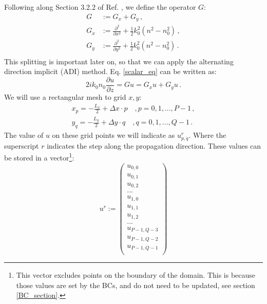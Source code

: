 \documentclass[]{article}
\begin{document}
	Following along Section 3.2.2 of Ref. \cite{Lifante_2015}, we define the operator $G$:
	\begin{subequations}
		\begin{align}
			G &:= G_x+G_y \, ,\\
			G_x &:=\frac{\partial^2}{\partial x^2}+\frac{1}{2}k_0^2(n^2-n_0^2)\, ,\\
			G_y &:=\frac{\partial^2}{\partial y^2}+\frac{1}{2}k_0^2(n^2-n_0^2)\, .\\
		\end{align}		
	\end{subequations}
	This splitting is important later on, so that we can apply the alternating direction implicit (ADI) method. Eq. \eqref{scalar_eq} can be written as:
	\begin{equation}
		2i k_0 n_0 \frac{\partial u}{\partial z} = G u = G_x u + G_y u\, .
		\label{G_operator_on_u}
	\end{equation}
	We will use a rectangular mesh to grid $x,y$:
	\begin{subequations}
		\begin{align}
			x_p = -\frac{L_x}{2}+\Delta x\cdot p \quad, p = 0,1,...,P-1\, ,\\
			y_q = -\frac{L_y}{2}+\Delta y\cdot q \quad, q = 0,1,...,Q-1\, .
		\end{align}
	\end{subequations}
	The value of $u$ on these grid points we will indicate as $u_{p,q}^r$. Where the superscript $r$ indicates the step along the propagation direction. These values can be stored in a vector\footnote{This vector excludes points on the boundary of the domain. This is because those values are set by the BCs, and do not need to be updated, see section \ref{BC_section}.}:
	\begin{equation}
		u^r := \begin{pmatrix}
			u_{0,0}\\
			u_{0,1}\\
			u_{0,2}\\
			...\\
			u_{1,0}\\
			u_{1,1}\\
			u_{1,2}\\
			...\\
			u_{P-1,Q-3}\\
			u_{P-1,Q-2}\\
			u_{P-1,Q-1}\\
			\end{pmatrix}
			\label{uvector}
	\end{equation}
\end{document}
